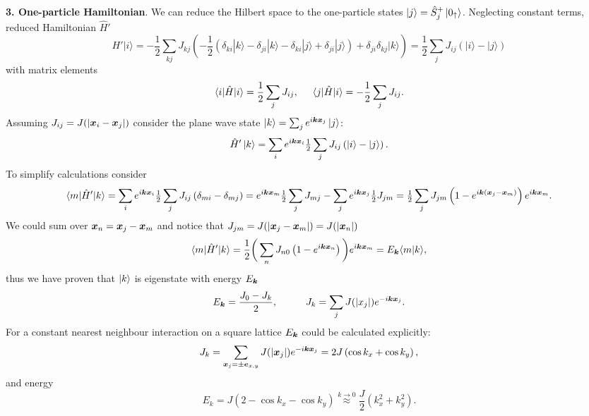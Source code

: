\textbf{3. One-particle Hamiltonian}. We can reduce the Hilbert space to the one-particle states $\left| j \right\rangle = \hat{S}^{+}_{j} \left| 0_{\uparrow} \right\rangle$. Neglecting constant terms, reduced Hamiltonian $\hat{H}'$
\begin{equation*}
 H'|i\rangle = -\frac{1}{2} \sum_{k j} J_{k j} \left(  - \frac{1}{2} \left( \delta_{ k i } | k \rangle - \delta_{j i} | k\rangle - \delta_{k i} |  j\rangle +  \delta_{j i }| j \rangle     \right) + \delta_{j i} \delta_{k j} | k \rangle   \right)   = \frac{1}{2} \sum_j J_{i j}(|i\rangle-|j\rangle)
\end{equation*}
with  matrix elements
\begin{equation*}
	\bk{i}[\hat{H}]{i} = \frac{1}{2} \sum_j J_{ij},
	\hspace{5 mm} 
	\bk{j}[\hat{H}]{i} = -\frac{1}{2} \sum_j J_{ij}.
\end{equation*}
Assuming $J_{ij} = J(|\boldsymbol{x}_i - \boldsymbol{x}_j|)$ consider the plane wave state $\left| k \right\rangle = \sum_j e^{i \boldsymbol{k} \boldsymbol{x}_j} \left| j \right\rangle$:
\begin{align*}
	\hat{H}' \left| k \right\rangle = \sum_i e^{i \boldsymbol{k} \boldsymbol{x}_i} \tfrac{1}{2} \sum_{j} J_{ij} \left(\left| i \right\rangle - \left| j \right\rangle\right).
\end{align*}
To simplify calculations consider
\begin{align*}
	\bk{m}[\hat{H}']{k} = \sum_i e^{i \vc{k} \vc{x}_i} \tfrac{1}{2} \sum_{j} J_{ij} \left(\delta_{mi} - \delta_{mj}\right) = e^{i \vc{k} \vc{x}_m} \tfrac{1}{2} \sum_j J_{mj} - \sum_j e^{i \vc{k} \vc{x}_j} \tfrac{1}{2} J_{jm}=  \tfrac{1}{2} \sum_j J_{jm} \left(1 - e^{i \vc{k}(\vc{x}_j - \vc{x}_m)}\right) e^{i \vc{k} \vc{x}_m}.
\end{align*}
We could sum over $\boldsymbol{x}_n = \boldsymbol{x}_j - \boldsymbol{x}_m$ and notice that $J_{jm} = J(|\boldsymbol{x}_j - \boldsymbol{x}_m|) = J(|\boldsymbol{x}_n|)$
\begin{equation*}
	\bk{m}[\hat{H}']{k}  = \frac{1}{2} \bigg(
		\sum_n J_{n0} \left(1-e^{i \vc{k} \vc{x}_n}\right)
	\bigg) e^{i \vc{k} \vc{x}_m} = E_{\vc{k}} \bk{m}{k},
\end{equation*}
thus we have proven that $\left| k \right\rangle$ is eigenstate with energy $E_{\boldsymbol{k}}$
\begin{equation*}
	E_{\vc{k}} = \frac{J_0 - J_k}{2},
	\hspace{10 mm} 
	J_k = \sum_j J(|x_j|) e^{-i \vc{k} \vc{x}_j}.
\end{equation*}
For a constant nearest neighbour interaction on a square lattice $E_{\boldsymbol{k}}$ could be calculated explicitly:
\begin{equation*}
	J_k = \sum_{\boldsymbol{x}_j = \pm \boldsymbol{e}_{x,y}} J(|\boldsymbol{x}_j|) e^{- i \boldsymbol{k} \boldsymbol{x}_j} = 2 J\left(
		\cos k_x + \cos k_y
	\right),
\end{equation*}
and energy
\begin{equation*}
	E_k = J\left(2 - \cos k_x - \cos k_y \right) \overset{k \to 0}{\approx} \frac{J}{2}\left(k_x^2 + k_y^2\right).
\end{equation*}